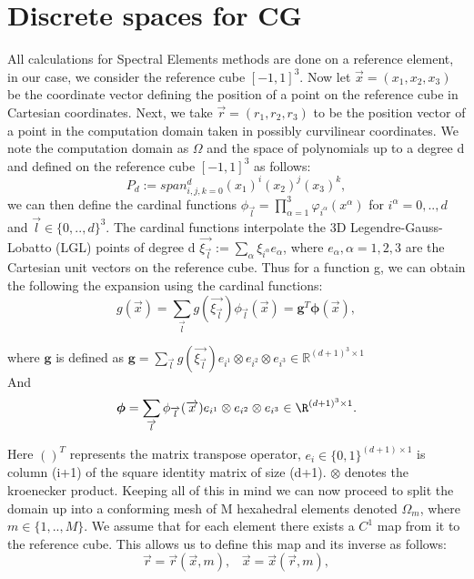 \documentclass{report}
\numberwithin{equation}{section}
\begin{document}
\section{Discrete spaces for CG}
All calculations for Spectral Elements methods are done on a reference element, in our case, we consider the reference cube $[-1,1]^3$. Now let $\overrightarrow{x} = (x_1,x_2,x_3)$ be the coordinate vector defining the position of a point on the reference cube in Cartesian coordinates. Next, we take $\overrightarrow{r} = (r_1,r_2,r_3)$ to be the position vector of a point in the computation domain taken in possibly curvilinear coordinates. We note the computation domain as $\Omega$ and the space of polynomials up to a degree d and defined on the reference cube $[-1,1]^3$ as follows:
\begin{equation}
    P_d :=span_{i,j,k=0}^d(x_1)^i(x_2)^j(x_3)^k,
\end{equation}
we can then define the cardinal functions $\phi_{\overrightarrow{l}} = \prod_{\alpha=1}^3 \varphi_{i^{\alpha}}(x^{\alpha})$ for $i^{\alpha}=0,..,d$ and $\overrightarrow{l} \in \{0,..,d\}^3$. The cardinal functions interpolate the 3D Legendre-Gauss-Lobatto (LGL) points of degree d $\overrightarrow{\xi_{\overrightarrow{l}}}:=\sum_{\alpha}\xi_{i^{\alpha}}e_{\alpha}$, where $e_{\alpha},\alpha = 1,2,3$ are the Cartesian unit vectors on the reference cube.  Thus for a function g, we can obtain the following the expansion using the cardinal functions:
\begin{equation}
    g(\overrightarrow{x}) = \sum_{\overrightarrow{l}}g(\overrightarrow{\xi_{\overrightarrow{l}}})\phi_{\overrightarrow{l}}(\overrightarrow{x}) = \textbf{g}^T\boldsymbol{\phi}(\overrightarrow{x}),
\end{equation}

where $\mathbf{g}$ is defined as $\mathbf{g}=\sum_{\overrightarrow{l}}g(\overrightarrow{\xi_{\overrightarrow{l}}})e_{i^1} \otimes e_{i^2} \otimes e_{i^3} \in \mathbb{R}^{(d+1)^3\times 1}$ \\
And \begin{equation}
    
\boldsymbol{\phi}=\sum_{\overrightarrow{l}}\phi_{\overrightarrow{l}}(\overrightarrow{x})e_{i^1} \otimes e_{i^2} \otimes e_{i^3} \in \R^{(d+1)^3\times 1}.
\end{equation}

Here $()^T$ represents the matrix transpose operator, $e_i \in \{0,1\}^{(d+1)\times 1}$ is column (i+1) of the square identity matrix of size (d+1). $\otimes$ denotes the kroenecker product. Keeping all of this in mind we can now proceed to split the domain up into a  conforming mesh of M hexahedral elements denoted $\Omega_m$, where $m \in \{1,..,M\}$. We assume that for each element there exists a $C^1$ map from it to the reference cube. This allows us to define this map and its inverse as follows:
\begin{equation}
    \overrightarrow{r}=\overrightarrow{r}(\overrightarrow{x},m), \hspace{10pt} \overrightarrow{x}=\overrightarrow{x}(\overrightarrow{r},m),
\end{equation}
\end{document}
